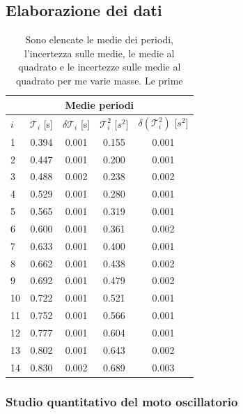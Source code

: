 \subsection{Elaborazione dei dati}

\begin{table}
    \centering
	\begin{tabular}{l c  c  c  c }
        \multicolumn{5}{c}{\textbf{Medie periodi}} \\
        \toprule
        $i$ & $\mathcal{T}_i$ [s] & $\delta\mathcal{T}_i$ [s] & $\mathcal{T}_i^2$ [$s^2$] & $\delta(\mathcal{T}_i^2)$ [$s^2$] \\

        \midrule

        1 & 0.394		& 0.001		& 0.155		& 0.001	\\
        2 & 0.447		& 0.001		& 0.200		& 0.001	\\
        3 & 0.488		& 0.002		& 0.238		& 0.002	\\
        4 & 0.529		& 0.001		& 0.280		& 0.001	\\
        5 & 0.565		& 0.001		& 0.319		& 0.001	\\
        6 & 0.600		& 0.001		& 0.361		& 0.002	\\
        7 & 0.633		& 0.001		& 0.400		& 0.001	\\
        8 & 0.662		& 0.001		& 0.438		& 0.002	\\
        9 & 0.692		& 0.001		& 0.479		& 0.002	\\
        10 & 0.722		& 0.001		& 0.521		& 0.001	\\
        11 & 0.752		& 0.001		& 0.566		& 0.001	\\
        12 & 0.777		& 0.001		& 0.604		& 0.001	\\
        13 & 0.802		& 0.001		& 0.643		& 0.002	\\
        14 & 0.830		& 0.002		& 0.689		& 0.003	\\

        \bottomrule

	\end{tabular}
    \caption{Sono elencate le medie dei periodi, l'incertezza sulle medie, le medie al quadrato e le incertezze sulle medie
    al quadrato per me varie masse. Le prime}
    \label{tab:calcolati}
\end{table}

\subsubsection{Studio quantitativo del moto oscillatorio}

